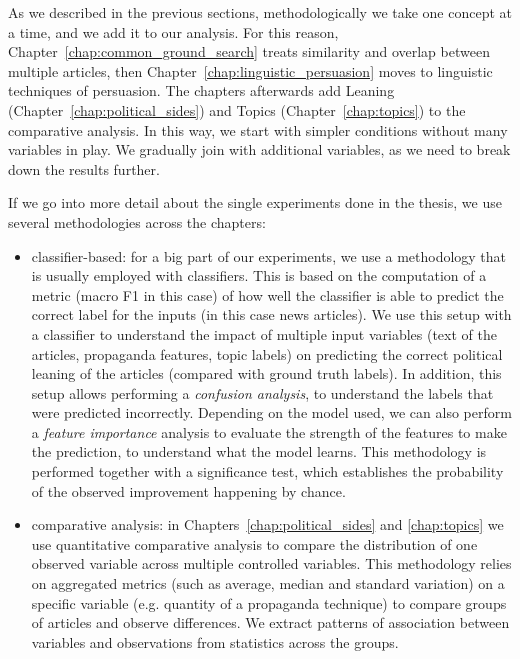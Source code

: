 As we described in the previous sections, methodologically we take one concept at a time, and we add it to our analysis. For this reason, Chapter~\ref{chap:common_ground_search} treats similarity and overlap between multiple articles, then Chapter~\ref{chap:linguistic_persuasion} moves to linguistic techniques of persuasion. The chapters afterwards add Leaning (Chapter~\ref{chap:political_sides}) and Topics (Chapter~\ref{chap:topics}) to the comparative analysis. In this way, we start with simpler conditions without many variables in play. We gradually join with additional variables, as we need to break down the results further.


If we go into more detail about the single experiments done in the thesis, we use several methodologies across the chapters:
\begin{itemize}
    \item classifier-based: for a big part of our experiments, we use a methodology that is usually employed with classifiers. This is based on the computation of a metric (macro F1 in this case) of how well the classifier is able to predict the correct label for the inputs (in this case news articles). We use this setup with a classifier to understand the impact of multiple input variables (text of the articles, propaganda features, topic labels) on predicting the correct political leaning of the articles (compared with ground truth labels).
    In addition, this setup allows performing a \emph{confusion analysis}, to understand the labels that were predicted incorrectly. Depending on the model used, we can also perform a \emph{feature importance} analysis to evaluate the strength of the features to make the prediction, to understand what the model learns. This methodology is performed together with a significance test, which establishes the probability of the observed improvement happening by chance.
    \item comparative analysis: in Chapters~\ref{chap:political_sides} and \ref{chap:topics} we use quantitative comparative analysis
    to compare the distribution of one observed variable across multiple controlled variables. This methodology relies on aggregated metrics (such as average, median and standard variation) on a specific variable (e.g. quantity of a propaganda technique) to compare groups of articles and observe differences. We extract patterns of association between variables and observations from statistics across the groups.
\end{itemize}


